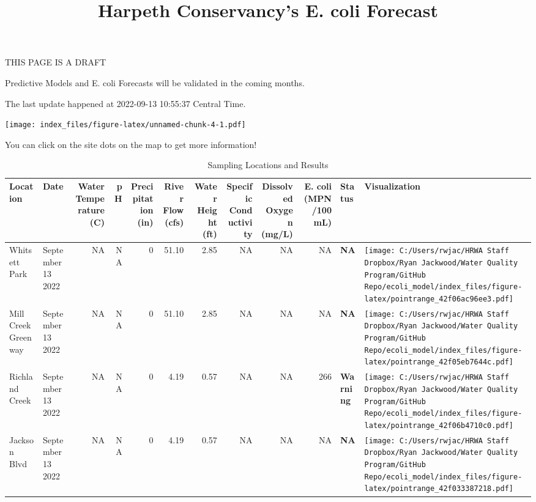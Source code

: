 \documentclass[
]{article}
\title{Harpeth Conservancy's E. coli Forecast}
\author{}
\date{\vspace{-2.5em}}
\begin{document}
\maketitle

THIS PAGE IS A DRAFT

Predictive Models and E. coli Forecasts will be validated in the coming
months.

The last update happened at 2022-09-13 10:55:37 Central Time.

\texttt{[image: index\_files/figure-latex/unnamed-chunk-4-1.pdf]}

You can click on the site dots on the map to get more information!

\begin{table}

\caption{\label{tab:unnamed-chunk-5}Sampling Locations and Results}
\fontsize{12}{14}\selectfont
\begin{tabular}[t]{>{}l||>{\raggedright\arraybackslash}p{2cm}|r|r|r|r|r|r|r|r|>{}l|>{}l}
\hline
Location & Date & Water Temperature (C) & pH & Precipitation (in) & River Flow (cfs) & Water Height (ft) & Specific Conductivity & Dissolved Oxygen (mg/L) & E. coli (MPN/100 mL) & Status & Visualization\\
\hline
Whitsett Park & September 13 2022 & NA & NA & 0 & 51.10 & 2.85 & NA & NA & NA & \textbf{NA} & \texttt{[image: C:/Users/rwjac/HRWA Staff Dropbox/Ryan Jackwood/Water Quality Program/GitHub Repo/ecoli\_model/index\_files/figure-latex/pointrange\_42f06ac96ee3.pdf]}\\
\hline
Mill Creek Greenway & September 13 2022 & NA & NA & 0 & 51.10 & 2.85 & NA & NA & NA & \textbf{NA} & \texttt{[image: C:/Users/rwjac/HRWA Staff Dropbox/Ryan Jackwood/Water Quality Program/GitHub Repo/ecoli\_model/index\_files/figure-latex/pointrange\_42f05eb7644c.pdf]}\\
\hline
Richland Creek & September 13 2022 & NA & NA & 0 & 4.19 & 0.57 & NA & NA & 266 & \textbf{Warning} & \texttt{[image: C:/Users/rwjac/HRWA Staff Dropbox/Ryan Jackwood/Water Quality Program/GitHub Repo/ecoli\_model/index\_files/figure-latex/pointrange\_42f06b4710c0.pdf]}\\
\hline
Jackson Blvd & September 13 2022 & NA & NA & 0 & 4.19 & 0.57 & NA & NA & NA & \textbf{NA} & \texttt{[image: C:/Users/rwjac/HRWA Staff Dropbox/Ryan Jackwood/Water Quality Program/GitHub Repo/ecoli\_model/index\_files/figure-latex/pointrange\_42f033387218.pdf]}\\

\end{tabular}
\end{table}
\end{document}

